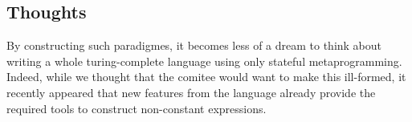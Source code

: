 \begin{comment}
It appears as though we could detect scope by injecting a templated friend function
statefully in the constructor or some random function. Because each scope should
be unique, we shall rely on the templated lambda trick.

\begin{verbatim}
template <typename Region>
struct region_base2 {
    ~region_base() noexcept {
        void(set<Region>{});
    }
    ...
};
\end{verbatim}

Therefore,

\begin{verbatim}
template<typename = decltype([]{})>
struct check_scope;

template <typename U = decltype([]{})>
struct Scope {
    ~Scope() noexcept {
        void(check_scope<U>{});
    }
};
\end{verbatim}

We now need to change our \texttt|wrapper| class accordingly to
our custom scope.

Unfortunately, I have not found a way to detect scope so that we would not need to define manually the beginning and the end of the borrowing regions. It would hypothetically require the ability to define a template destructor in our \texttt|region_base| class such that we could inject the friend function's definition.

\begin{verbatim}
// TODO: hypothetic implementation
\end{verbatim}

\begin{verbatim}
int main() {
    {
        auto x = r::make<int>(1);
        auto v = r::make<std::vector<int>>();
        x.get() = 42;
        v.get().emplace_back(42);
    }

    x.get() = 0; // error
    v.get().clear(); // error
}
\end{verbatim}
\end{comment}

\subsection*{Thoughts}

By constructing such paradigmes, it becomes less of a dream to think about 
writing a whole turing-complete language using only stateful metaprogramming. 
Indeed, while we thought that the comitee would want to make this ill-formed, 
it recently appeared that new features from the language already provide the 
required tools to construct non-constant expressions. 

